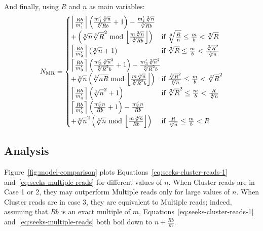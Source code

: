 \documentclass[10pt, conference, compsocconf]{IEEEtran}
\DeclarePairedDelimiter{\ceil}{\lceil}{\rceil}
\DeclarePairedDelimiter{\floor}{\lfloor}{\rfloor}
\begin{document}
And finally, using $R$ and $n$ as main variables:
\begin{equation}
N_\mathrm{MR} =
\begin{cases}
  \ceil*{\frac{Rb}{m_1'}}\left(\frac{m_1'\sqrt[3]{n}}{\sqrt[3]{R}b}+1\right)-\frac{m_1'\sqrt[3]{n}}{\sqrt[3]{R}b}\\[0.4em]
   +\left( \sqrt[3]{n}\sqrt[3]{R}^2 \text{ mod }\floor*{\frac{m\sqrt[3]{n}}{\sqrt[3]{R}b}}\right)\
  & \text{\hspace*{-0.9em}if } \sqrt[3]{\frac{R}{n}} \leq \frac{m}{b} < \sqrt[3]{R}\\[0.4em]

  \ceil*{\frac{Rb}{m_2'}}\left(\sqrt[3]{n}+1\right)\
  & \text{\hspace*{-0.9em}if } \sqrt[3]{R} \leq \frac{m}{b} < \frac{\sqrt[3]{R}^2}{\sqrt[3]{n}}\\[0.4em]

  \ceil*{\frac{Rb}{m_3'}}\left(\frac{m'_3\sqrt[3]{n}^2}{\sqrt[3]{R}^2b}+1\right)-\frac{m'_3\sqrt[3]{n}^2}{\sqrt[3]{R}^2b}\\[0.4em]
  +\sqrt[3]{n}\left( \sqrt[3]{nR} \text{ mod } \floor*{\frac{m\sqrt[3]{n}}{\sqrt[3]{R}^2b}} \right)
  & \text{\hspace*{-0.9em}if } \frac{\sqrt[3]{R}^2}{\sqrt[3]{n}} \leq \frac{m}{b} < \sqrt[3]{R}^2\\[0.4em]

  \ceil*{\frac{Rb}{m_4'}}\left(\sqrt[3]{n}^2+1\right)\
  & \text{\hspace*{-0.9em}if } \sqrt[3]{R}^2 \leq \frac{m}{b} < \frac{R}{\sqrt[3]{n}}\\[0.4em]

  \ceil*{\frac{Rb}{m_5'}}\left(\frac{m_5'n}{Rb}+1\right)-\frac{m_5'n}{Rb}\\[0.4em]
  +\sqrt[3]{n}^2\left( \sqrt[3]{n} \text{ mod } \floor*{\frac{m\sqrt[3]{n}}{Rb}}\right)
  & \text{\hspace*{-0.9em}if } \frac{R}{\sqrt[3]{n}} \leq \frac{m}{b} < R
\end{cases} \label{eq:seeks-multiple-reads}
\end{equation}

\subsection{Analysis}
\label{sec:analysis}

Figure~\ref{fig:model-comparison} plots
Equations~\ref{eq:seeks-cluster-reads-1}
and~\ref{eq:seeks-multiple-reads} for different values of $n$. When
Cluster reads are in Case 1 or 2, they may outperform Multiple reads
only for large values of $n$. When Cluster reads are in case 3, they
are equivalent to Multiple reads; indeed, assuming that $Rb$ is an
exact multiple of $m$, Equations~\ref{eq:seeks-cluster-reads-1}
and~\ref{eq:seeks-multiple-reads} both boil down to $n+\frac{Rb}{m}$.
\end{document}
